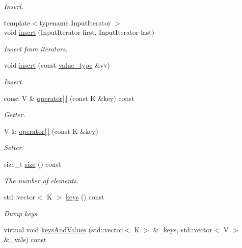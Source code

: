 \begin{DoxyCompactItemize}
\begin{DoxyCompactList}\small\item\em Insert. \end{DoxyCompactList}\item 
{\footnotesize template$<$typename Input\+Iterator $>$ }\\void \mbox{\hyperlink{classADAT_1_1MapObject_a151aa826b6db5cd124ed13f4a293da2b}{insert}} (Input\+Iterator first, Input\+Iterator last)
\begin{DoxyCompactList}\small\item\em Insert from iterators. \end{DoxyCompactList}\item 
void \mbox{\hyperlink{classADAT_1_1MapObject_aaa819ee6219acf8f74c39563c9c68ab4}{insert}} (const \mbox{\hyperlink{classADAT_1_1MapObject_ad985e6ff5b35a72c79d4b466d316cc0a}{value\+\_\+type}} \&vv)
\begin{DoxyCompactList}\small\item\em Insert. \end{DoxyCompactList}\item 
const V \& \mbox{\hyperlink{classADAT_1_1MapObject_adb014dc7d3ef80a73fd1734e818eeef4}{operator\mbox{[}$\,$\mbox{]}}} (const K \&key) const
\begin{DoxyCompactList}\small\item\em Getter. \end{DoxyCompactList}\item 
V \& \mbox{\hyperlink{classADAT_1_1MapObject_ab6ac0d8eccffc7975fd329649dd6f9e7}{operator\mbox{[}$\,$\mbox{]}}} (const K \&key)
\begin{DoxyCompactList}\small\item\em Setter. \end{DoxyCompactList}\item 
size\+\_\+t \mbox{\hyperlink{classADAT_1_1MapObject_ac0f5c3b258d234a7baf4f3d75e304af7}{size}} () const
\begin{DoxyCompactList}\small\item\em The number of elements. \end{DoxyCompactList}\item 
std\+::vector$<$ K $>$ \mbox{\hyperlink{classADAT_1_1MapObject_af767d0e9da82e3a249d3340d57da66e1}{keys}} () const
\begin{DoxyCompactList}\small\item\em Dump keys. \end{DoxyCompactList}\item 
virtual void \mbox{\hyperlink{classADAT_1_1MapObject_ab19c1622f3edfd0755e42583e6a48844}{keys\+And\+Values}} (std\+::vector$<$ K $>$ \&\+\_\+keys, std\+::vector$<$ V $>$ \&\+\_\+vals) const

\end{DoxyCompactItemize}

